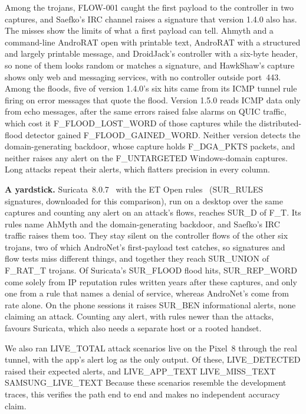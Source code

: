 \documentclass[runningheads]{llncs}
\begin{document}
Among the trojans, FLOW-001 caught the first payload to the controller in two captures, and Saefko's IRC channel raises a signature that version 1.4.0 also has. The misses show the limits of what a first payload can tell. Ahmyth and a command-line AndroRAT open with printable text, AndroRAT with a structured and largely printable message, and DroidJack's controller with a six-byte header, so none of them looks random or matches a signature, and HawkShaw's capture shows only web and messaging services, with no controller outside port~443. Among the floods, five of version 1.4.0's six hits came from its ICMP tunnel rule firing on error messages that quote the flood. Version 1.5.0 reads ICMP data only from echo messages, after the same errors raised false alarms on QUIC traffic, which cost it {{F_FLOOD_LOST_WORD}} of those captures while the distributed-flood detector gained {{F_FLOOD_GAINED_WORD}}. Neither version detects the domain-generating backdoor, whose capture holds {{F_DGA_PKTS}} packets, and neither raises any alert on the {{F_UNTARGETED}} Windows-domain captures. Long attacks repeat their alerts, which flatters precision in every column.

\textbf{A yardstick.} Suricata~8.0.7~\cite{suricata} with the ET Open rules~\cite{etopen} ({{SUR_RULES}} signatures, downloaded for this comparison), run on a desktop over the same captures and counting any alert on an attack's flows, reaches {{SUR_D}} of {{F_T}}. Its rules name AhMyth and the domain-generating backdoor, and Saefko's IRC traffic raises them too. They stay silent on the controller flows of the other six trojans, two of which AndroNet's first-payload test catches, so signatures and flow tests miss different things, and together they reach {{SUR_UNION}} of {{F_RAT_T}} trojans. Of Suricata's {{SUR_FLOOD}} flood hits, {{SUR_REP_WORD}} come solely from IP reputation rules written years after these captures, and only one from a rule that names a denial of service, whereas AndroNet's come from rate alone. On the phone sessions it raises {{SUR_BEN}} informational alerts, none claiming an attack. Counting any alert, with rules newer than the attacks, favours Suricata, which also needs a separate host or a rooted handset.

We also ran {{LIVE_TOTAL}} attack scenarios live on the Pixel~8 through the real tunnel, with the app's alert log as the only output. Of these, {{LIVE_DETECTED}} raised their expected alerts, and {{LIVE_APP_TEXT}} {{LIVE_MISS_TEXT}} {{SAMSUNG_LIVE_TEXT}} Because these scenarios resemble the development traces, this verifies the path end to end and makes no independent accuracy claim.
\end{document}
